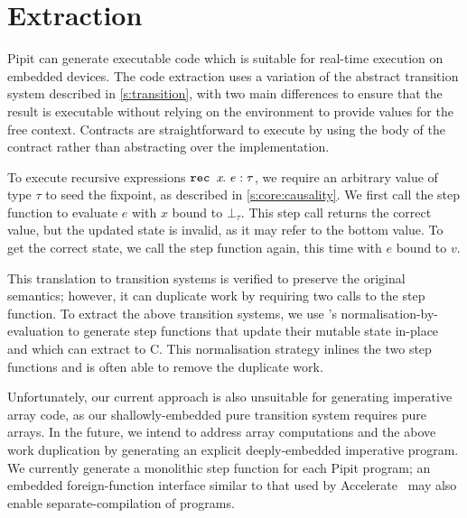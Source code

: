 

\section{Extraction}
\label{s:extraction}

Pipit can generate executable code which is suitable for real-time execution on embedded devices.
The code extraction uses a variation of the abstract transition system described in \autoref{s:transition}, with two main differences to ensure that the result is executable without relying on the environment to provide values for the free context.
Contracts are straightforward to execute by using the body of the contract rather than abstracting over the implementation.

To execute recursive expressions $\texttt{rec~} x\hspace{-0.1em}.~e : \tau$, we require an arbitrary value of type $\tau$ to seed the fixpoint, as described in \autoref{s:core:causality}.
We first call the step function to evaluate $e$ with $x$ bound to $\bot_\tau$.
This step call returns the correct value, but the updated state is invalid, as it may refer to the bottom value.
To get the correct state, we call the step function again, this time with $e$ bound to $v$.

This translation to transition systems is verified to preserve the original semantics; however, it can duplicate work by requiring two calls to the step function.
To extract the above transition systems, we use \fstar{}'s normalisation-by-evaluation to generate step functions that update their mutable state in-place and which \lowstar{} can extract to C.
This normalisation strategy inlines the two step functions and is often able to remove the duplicate work.

Unfortunately, our current approach is also unsuitable for generating imperative array code, as our shallowly-embedded pure transition system requires pure arrays.
In the future, we intend to address array computations and the above work duplication by generating an explicit deeply-embedded imperative program.
We currently generate a monolithic step function for each Pipit program; an embedded foreign-function interface similar to that used by Accelerate~\cite{clifton2014embedding} may also enable separate-compilation of programs.

 \cite{ho2022noise}